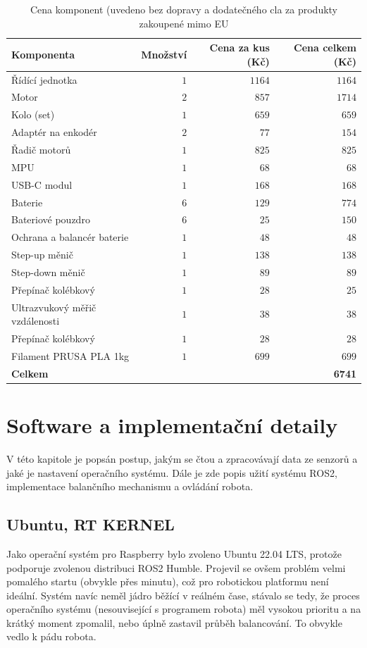 \begin{table}[H]
	\vskip6pt
	\caption{Cena komponent (uvedeno bez dopravy a dodatečného cla za produkty zakoupené mimo EU} 
    \vskip6pt
	\centering
	\begin{tabular}{lrrr}
		\toprule
		Komponenta & Množství & Cena za kus (Kč) & Cena celkem (Kč) \\
		\midrule
        Řídící jednotka & $1$ & $1164$ & $1164$ \\
		Motor & $2$ & $857$ & $1714$ \\
        Kolo (set) & $1$ & $659$ & $659$ \\
        Adaptér na enkodér & $2$ & $77$ & $154$ \\
        Řadič motorů & $1$ & $825$ & $825$ \\
        MPU & $1$ & $68$ & $68$  \\
        USB-C modul & $1$ & $168$ & $168$ \\
        Baterie & $6$ & $129$ & $774$ \\
        Bateriové pouzdro & $6$ & $25$ & $150$ \\
        Ochrana a balancér baterie & $1$ & $48$ & $48$ \\
        Step-up měnič & $1$ & $138$ & $138$ \\
        Step-down měnič & $1$ & $89$ & $89$ \\
        Přepínač kolébkový & $1$ & $28$ & $25$ \\
        Ultrazvukový měřič vzdálenosti & $1$ & $38$ & $38$ \\
        Přepínač kolébkový & $1$ & $28$ & $28$ \\
        Filament PRUSA PLA 1kg & $1$ & $699$ & $699$ \\
        \midrule
        \textbf{Celkem} & & & \textbf{6741} \\
		\bottomrule
	\end{tabular}
	\label{tab:ExampleTable}
\end{table}


\chapter{Software a implementační detaily}
\label{chap5}
V této kapitole je popsán postup, jakým se čtou a zpracovávají data ze senzorů a jaké je nastavení operačního systému. Dále je zde popis užití systému ROS2, implementace balančního mechanismu a ovládání robota.

\section{Ubuntu, RT KERNEL}
\label{system}
Jako operační systém pro Raspberry bylo zvoleno Ubuntu 22.04 LTS, protože podporuje zvolenou distribuci ROS2 Humble. Projevil se ovšem problém velmi pomalého startu (obvykle přes minutu), což pro robotickou platformu není ideální. Systém navíc neměl jádro běžící v reálném čase, stávalo se tedy, že proces operačního systému (nesouvisející s programem robota) měl vysokou prioritu a na krátký moment zpomalil, nebo úplně zastavil průběh balancování. To obvykle vedlo k pádu robota.

